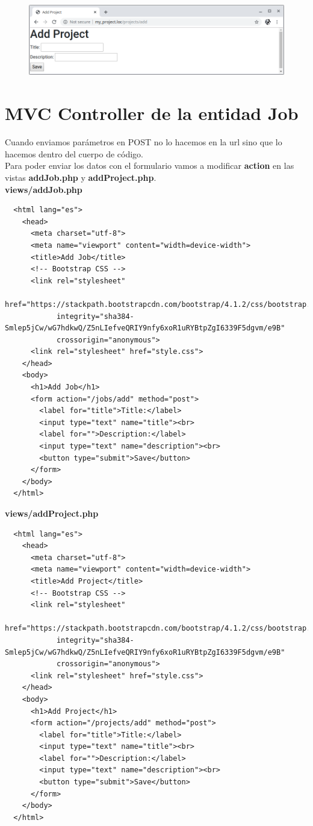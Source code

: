 \documentclass{article}
\begin{document}
\begin{figure}[h!]
  \centering
  \includegraphics[scale=0.5]{./Pictures/134_ProjectsControllerOK.png}
\end{figure}

\newpage


\section{MVC Controller de la entidad Job}%
Cuando enviamos parámetros en POST no lo hacemos en la url sino que lo hacemos
dentro del cuerpo de código.\\

Para poder enviar los datos con el formulario vamos a modificar \textbf{action}
en las vistas \textbf{addJob.php} y \textbf{addProject.php}.\\

\textbf{views/addJob.php}
\begin{verbatim}
  <html lang="es">
    <head>
      <meta charset="utf-8">
      <meta name="viewport" content="width=device-width">
      <title>Add Job</title>
      <!-- Bootstrap CSS -->
      <link rel="stylesheet"
            href="https://stackpath.bootstrapcdn.com/bootstrap/4.1.2/css/bootstrap.min.css"
            integrity="sha384-Smlep5jCw/wG7hdkwQ/Z5nLIefveQRIY9nfy6xoR1uRYBtpZgI6339F5dgvm/e9B"
            crossorigin="anonymous">
      <link rel="stylesheet" href="style.css">
    </head>
    <body>
      <h1>Add Job</h1>
      <form action="/jobs/add" method="post">
        <label for="title">Title:</label>
        <input type="text" name="title"><br>
        <label for="">Description:</label>
        <input type="text" name="description"><br>
        <button type="submit">Save</button>
      </form>
    </body>
  </html>
\end{verbatim}

\textbf{views/addProject.php}
\begin{verbatim}
  <html lang="es">
    <head>
      <meta charset="utf-8">
      <meta name="viewport" content="width=device-width">
      <title>Add Project</title>
      <!-- Bootstrap CSS -->
      <link rel="stylesheet"
            href="https://stackpath.bootstrapcdn.com/bootstrap/4.1.2/css/bootstrap.min.css"
            integrity="sha384-Smlep5jCw/wG7hdkwQ/Z5nLIefveQRIY9nfy6xoR1uRYBtpZgI6339F5dgvm/e9B"
            crossorigin="anonymous">
      <link rel="stylesheet" href="style.css">
    </head>
    <body>
      <h1>Add Project</h1>
      <form action="/projects/add" method="post">
        <label for="title">Title:</label>
        <input type="text" name="title"><br>
        <label for="">Description:</label>
        <input type="text" name="description"><br>
        <button type="submit">Save</button>
      </form>
    </body>
  </html>
\end{verbatim}
\end{document}
